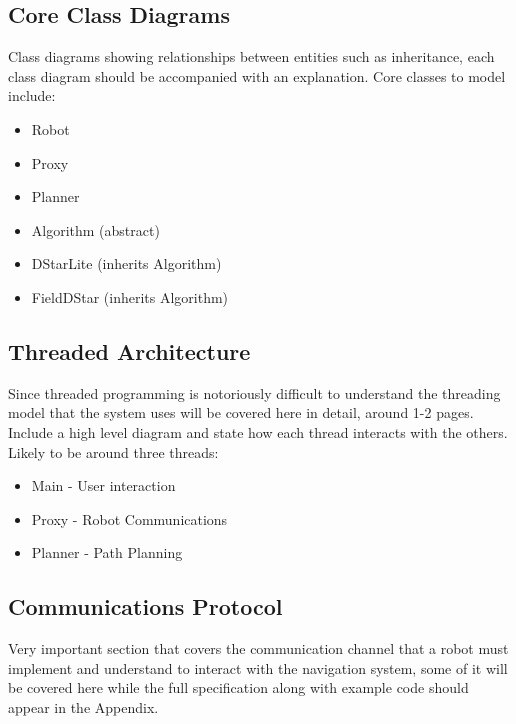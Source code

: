 \subsection{Core Class Diagrams}

\noindent
Class diagrams showing relationships between entities such as inheritance, each class diagram should be accompanied with an explanation. Core classes to model include:

\begin{itemize}
\item Robot
\item Proxy
\item Planner
\item Algorithm (abstract)
\item DStarLite (inherits Algorithm)
\item FieldDStar (inherits Algorithm)
\end{itemize} 

\newpage

\subsection{Threaded Architecture}

\noindent
Since threaded programming is notoriously difficult to understand the threading model that the system uses will be covered here in detail, around 1-2 pages. Include a high level diagram and state how each thread interacts with the others. Likely to be around three threads:

\begin{itemize}
\item Main - User interaction
\item Proxy - Robot Communications
\item Planner - Path Planning
\end{itemize} 

\subsection{Communications Protocol}\label{sec:protocol}
Very important section that covers the communication channel that a robot must implement and understand to interact with the navigation system, some of it will be covered here while the full specification along with example code should appear in the Appendix.


